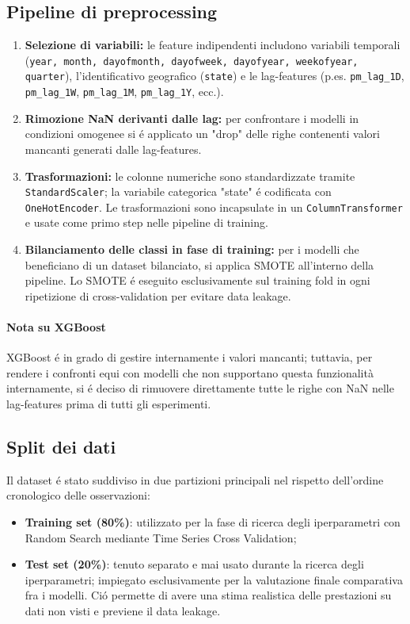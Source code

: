 \documentclass[a4paper,12pt]{report}
\begin{document}
	\subsection{Pipeline di preprocessing}
	\begin{enumerate}
		\item \textbf{Selezione di variabili:} le feature indipendenti includono variabili temporali (\texttt{year, month, dayofmonth, dayofweek, dayofyear, weekofyear, quarter}), l'identificativo geografico (\texttt{state}) e le lag-features (p.es. \texttt{pm\_lag\_1D}, \texttt{pm\_lag\_1W}, \texttt{pm\_lag\_1M}, \texttt{pm\_lag\_1Y}, ecc.).
		\item \textbf{Rimozione NaN derivanti dalle lag:} per confrontare i modelli in condizioni omogenee si é applicato un "drop" delle righe contenenti valori mancanti generati dalle lag-features.
		\item \textbf{Trasformazioni:} le colonne numeriche sono standardizzate tramite \texttt{StandardScaler}; la variabile categorica "state" é codificata con \texttt{OneHotEncoder}. Le trasformazioni sono incapsulate in un \texttt{ColumnTransformer} e usate come primo step nelle pipeline di training.
		\item \textbf{Bilanciamento delle classi in fase di training:} per i modelli che beneficiano di un dataset bilanciato, si applica SMOTE all'interno della pipeline. Lo SMOTE é eseguito esclusivamente sul training fold in ogni ripetizione di cross-validation per evitare data leakage. \cite{chawla2011smote}
	\end{enumerate}
	
	\paragraph{Nota su XGBoost} XGBoost é in grado di gestire internamente i valori mancanti; tuttavia, per rendere i confronti equi con modelli che non supportano questa funzionalità internamente, si é deciso di rimuovere direttamente tutte le righe con NaN nelle lag-features prima di tutti gli esperimenti.
	
	\subsection{Split dei dati}
	Il dataset é stato suddiviso in due partizioni principali nel rispetto dell'ordine cronologico delle osservazioni:
	
	\begin{itemize}
		\item \textbf{Training set (80\%)}: utilizzato per la fase di ricerca degli iperparametri con Random Search mediante Time Series Cross Validation;
		\item \textbf{Test set (20\%)}: tenuto separato e mai usato durante la ricerca degli iperparametri; impiegato esclusivamente per la valutazione finale comparativa fra i modelli. Ció permette di avere una stima realistica delle prestazioni su dati non visti e previene il data leakage.
	\end{itemize}
	
\end{document}
